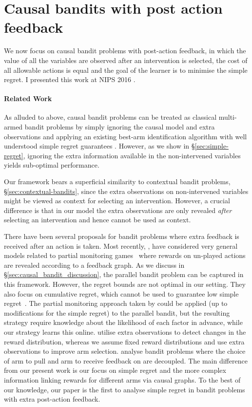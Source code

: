 \documentclass[11pt,a4paper,twoside]{report}
\theoremstyle{plain}
\theoremstyle{definition}
\begin{document}
\section{Causal bandits with post action feedback}
\label{sec:causal-bandit-post-action-feedback}

We now focus on causal bandit problems with post-action feedback, in which the value of all the variables are observed after an intervention is selected, the cost of all allowable actions is equal and the goal of the learner is to minimise the simple regret. I presented this work at NIPS 2016 \citep{NIPS2016_6195}.

\paragraph{Related Work} As alluded to above, causal bandit problems can be treated as classical multi-armed bandit problems by simply ignoring the causal model and extra observations and applying an existing best-arm identification algorithm with well understood simple regret guarantees \citep{Jamieson2013}. However, as we show in \S\ref{sec:simple-regret}, ignoring the extra information available in the non-intervened variables yields sub-optimal performance.

Our framework bears a superficial similarity to contextual bandit problems, \S\ref{sec:contextual-bandits}, since the extra observations on non-intervened variables might be viewed as context for selecting an intervention. 
However, a crucial difference is that in our model the extra observations are only revealed \emph{after} selecting an intervention and hence cannot be used as context. 

There have been several proposals for bandit problems where extra feedback is received after an action is taken.
Most recently, \citet{Alon2015}, \citet{Kocak2014} have considered very general models related to partial monitoring games~\citep{Bartok2014} where rewards on un-played actions are revealed according to a feedback graph. As we discuss in \S\ref{sec:causal_bandit_discussion}, the parallel bandit problem can be captured in this framework. However, the regret bounds are not optimal in our setting. They also focus on cumulative regret, which cannot be used to guarantee low simple regret~\citep{Bubeck2009a}. The partial monitoring approach taken by \citet{wu2015online} could be applied (up to modifications for the simple regret) to the parallel bandit, but the resulting strategy require knowledge about the likelihood of each factor in advance, while our strategy learns this online. \citet{Yu2009} utilise extra observations to detect changes in the reward distribution, whereas we assume fixed reward distributions and use extra observations to improve arm selection. \citet{Avner2012} analyse bandit problems where the choice of arm to pull and arm to receive feedback on are decoupled. The main difference from our present work is our focus on simple regret and the more complex information linking rewards for different arms via causal graphs. To the best of our knowledge, our paper is the first to analyse simple regret in bandit problems with extra post-action feedback.
\end{document}
